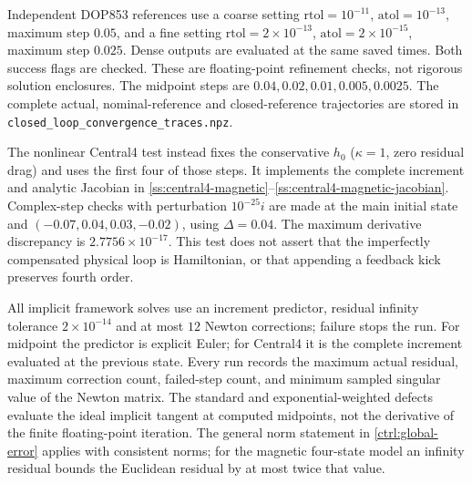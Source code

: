 Independent DOP853 references use a coarse setting
$\mathrm{rtol}=10^{-11}$, $\mathrm{atol}=10^{-13}$,
maximum step $0.05$, and a fine setting
$\mathrm{rtol}=2\times10^{-13}$, $\mathrm{atol}=2\times10^{-15}$,
maximum step $0.025$. Dense outputs are evaluated at the same saved
times. Both success flags are checked. These are floating-point
refinement checks, not rigorous solution enclosures. The midpoint steps
are $0.04,0.02,0.01,0.005,0.0025$. The complete actual, nominal-reference
and closed-reference trajectories are stored in
\texttt{closed\_loop\_convergence\_traces.npz}.

The nonlinear Central4 test instead fixes the conservative $h_0$
($\kappa=1$, zero residual drag) and uses the first four of those steps.
It implements the complete increment and analytic Jacobian in
\eqref{ss:central4-magnetic}--\eqref{ss:central4-magnetic-jacobian}.
Complex-step checks with perturbation $10^{-25}i$ are made at the main
initial state and $(-0.07,0.04,0.03,-0.02)$, using $\Delta=0.04$.
The maximum derivative discrepancy is $2.7756\times10^{-17}$.
This test does not assert that the imperfectly compensated physical loop
is Hamiltonian, or that appending a feedback kick preserves fourth order.

All implicit framework solves use an increment predictor, residual
infinity tolerance $2\times10^{-14}$ and at most $12$ Newton corrections;
failure stops the run. For midpoint the predictor is explicit Euler;
for Central4 it is the complete increment evaluated at the previous
state. Every run records the maximum actual residual, maximum correction
count, failed-step count, and minimum sampled singular value of the
Newton matrix. The standard and exponential-weighted defects evaluate
the ideal implicit tangent at computed midpoints, not the derivative
of the finite floating-point iteration. The general norm statement in
\eqref{ctrl:global-error} applies with consistent norms; for the magnetic
four-state model an infinity residual bounds the Euclidean residual
by at most twice that value.

